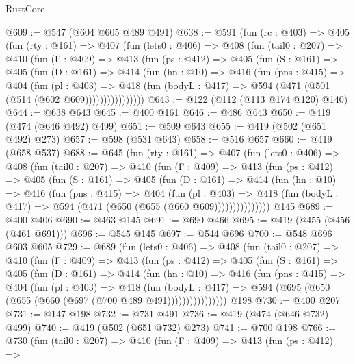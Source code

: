 \begin{lexlean}{RustCore}
\begin{coremodule}
@609 := @547 (@604 @605 @489 @491)
@638 := @591
    (fun (rc : @403) =>
    @405
      (fun (rty : @161) =>
      @407
        (fun (lets0 : @406) =>
        @408
          (fun (tail0 : @207) =>
          @410
            (fun (Γ : @409) =>
            @413
              (fun (ps : @412) =>
              @405
                (fun (S : @161) =>
                @405
                  (fun (D : @161) =>
                  @414
                    (fun (hn : @10) =>
                    @416
                      (fun (pns : @415) =>
                      @404
                        (fun (pl : @403) =>
                        @418
                          (fun (bodyL : @417) => @594 (@471 (@501 (@514 (@602 @609))))))))))))))))
@643 := @122 (@112 (@113 @174 @120) @140)
@644 := @638 @643
@645 := @400 @161
@646 := @486 @643
@650 := @419 (@474 (@646 @492) @499)
@651 := @509 @643
@655 := @419 (@502 (@651 @492) @273)
@657 := @598 (@531 @643)
@658 := @516 @657
@660 := @419 (@658 @537)
@688 := @645
    (fun (rty : @161) =>
    @407
      (fun (lets0 : @406) =>
      @408
        (fun (tail0 : @207) =>
        @410
          (fun (Γ : @409) =>
          @413
            (fun (ps : @412) =>
            @405
              (fun (S : @161) =>
              @405
                (fun (D : @161) =>
                @414
                  (fun (hn : @10) =>
                  @416
                    (fun (pns : @415) =>
                    @404
                      (fun (pl : @403) =>
                      @418 (fun (bodyL : @417) => @594 (@471 (@650 (@655 (@660 @609)))))))))))))))
    @145
@689 := @400 @406
@690 := @463 @145
@691 := @690 @466
@695 := @419 (@455 (@456 (@461 @691)))
@696 := @545 @145
@697 := @544 @696
@700 := @548 @696 @603 @605
@729 := @689
    (fun (lets0 : @406) =>
    @408
      (fun (tail0 : @207) =>
      @410
        (fun (Γ : @409) =>
        @413
          (fun (ps : @412) =>
          @405
            (fun (S : @161) =>
            @405
              (fun (D : @161) =>
              @414
                (fun (hn : @10) =>
                @416
                  (fun (pns : @415) =>
                  @404
                    (fun (pl : @403) =>
                    @418
                      (fun (bodyL : @417) =>
                      @594 (@695 (@650 (@655 (@660 (@697 (@700 @489 @491))))))))))))))))
    @198
@730 := @400 @207
@731 := @147 @198
@732 := @731 @491
@736 := @419 (@474 (@646 @732) @499)
@740 := @419 (@502 (@651 @732) @273)
@741 := @700 @198
@766 := @730
    (fun (tail0 : @207) =>
    @410
      (fun (Γ : @409) =>
      @413
        (fun (ps : @412) =>

\end{coremodule}
\end{lexlean}

